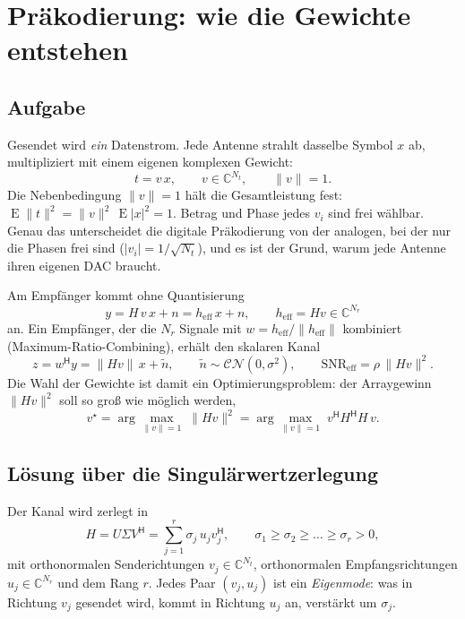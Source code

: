 \documentclass[11pt,a4paper]{article}
\newcommand{\E}{\operatorname{E}}
\begin{document}
\section{Präkodierung: wie die Gewichte entstehen}\label{sec:prec}

\subsection{Aufgabe}

Gesendet wird \emph{ein} Datenstrom. Jede Antenne strahlt dasselbe Symbol $x$ ab, multipliziert
mit einem eigenen komplexen Gewicht:
\begin{equation}
t=v\,x,\qquad v\in\mathbb C^{N_t},\qquad \|v\|=1 .
\end{equation}
Die Nebenbedingung $\|v\|=1$ hält die Gesamtleistung fest: $\E\|t\|^2=\|v\|^2\,\E|x|^2=1$. Betrag
und Phase jedes $v_i$ sind frei wählbar. Genau das unterscheidet die digitale Präkodierung von der
analogen, bei der nur die Phasen frei sind ($|v_i|=1/\sqrt{N_t}$), und es ist der Grund, warum jede
Antenne ihren eigenen DAC braucht.

Am Empfänger kommt ohne Quantisierung
\begin{equation}
y=H\,v\,x+n=h_{\mathrm{eff}}\,x+n,\qquad h_{\mathrm{eff}}=Hv\in\mathbb C^{N_r}
\end{equation}
an. Ein Empfänger, der die $N_r$ Signale mit $w=h_{\mathrm{eff}}/\|h_{\mathrm{eff}}\|$ kombiniert
(Maximum-Ratio-Combining), erhält den skalaren Kanal
\begin{equation}
z=w^{\mathsf H}y=\|Hv\|\,x+\tilde n,\qquad \tilde n\sim\mathcal{CN}(0,\sigma^2),\qquad
\mathrm{SNR}_{\mathrm{eff}}=\rho\,\|Hv\|^2 .
\end{equation}
Die Wahl der Gewichte ist damit ein Optimierungsproblem: der Arraygewinn $\|Hv\|^2$ soll so groß
wie möglich werden,
\begin{equation}\label{eq:opt}
v^\star=\arg\max_{\|v\|=1}\;\|Hv\|^2=\arg\max_{\|v\|=1}\;v^{\mathsf H}H^{\mathsf H}H\,v .
\end{equation}

\subsection{Lösung über die Singulärwertzerlegung}

Der Kanal wird zerlegt in
\begin{equation}
H=U\Sigma V^{\mathsf H}=\sum_{j=1}^{r}\sigma_j\,u_jv_j^{\mathsf H},\qquad
\sigma_1\ge\sigma_2\ge\dots\ge\sigma_r>0,
\end{equation}
mit orthonormalen Senderichtungen $v_j\in\mathbb C^{N_t}$, orthonormalen Empfangsrichtungen
$u_j\in\mathbb C^{N_r}$ und dem Rang $r$. Jedes Paar $(v_j,u_j)$ ist ein \emph{Eigenmode}: was in
Richtung $v_j$ gesendet wird, kommt in Richtung $u_j$ an, verstärkt um $\sigma_j$.
\end{document}
